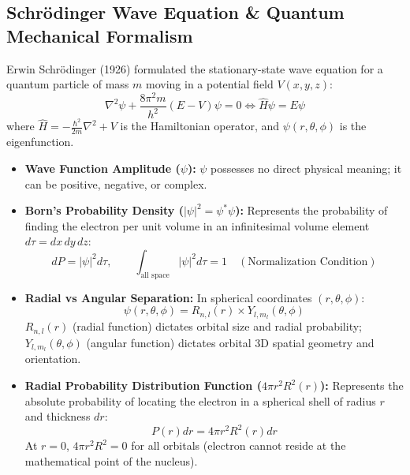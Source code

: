 \documentclass[10pt,twoside,openright]{book}
\begin{document}
\subsection{Schrödinger Wave Equation \& Quantum Mechanical Formalism}
Erwin Schrödinger (1926) formulated the stationary-state wave equation for a quantum particle of mass $m$ moving in a potential field $V(x,y,z)$:
\begin{equation}
  \nabla^2 \psi + \frac{8\pi^2 m}{h^2}(E - V)\psi = 0 \iff \hat{H}\psi = E\psi
\end{equation}
where $\hat{H} = -\frac{\hbar^2}{2m}\nabla^2 + V$ is the Hamiltonian operator, and $\psi(r, \theta, \phi)$ is the eigenfunction.

\begin{conceptbox}
\begin{itemize}
  \item \textbf{Wave Function Amplitude ($\psi$):} $\psi$ possesses no direct physical meaning; it can be positive, negative, or complex.
  \item \textbf{Born's Probability Density ($|\psi|^2 = \psi^* \psi$):} Represents the probability of finding the electron per unit volume in an infinitesimal volume element $d\tau = dx\,dy\,dz$:
  \begin{equation}
    dP = |\psi|^2 d\tau, \qquad \int_{\text{all space}} |\psi|^2 d\tau = 1 \quad (\text{Normalization Condition})
  \end{equation}
  \item \textbf{Radial vs Angular Separation:} In spherical coordinates $(r, \theta, \phi)$:
  \begin{equation}
    \psi(r, \theta, \phi) = R_{n,l}(r) \times Y_{l,m_l}(\theta, \phi)
  \end{equation}
  $R_{n,l}(r)$ (radial function) dictates orbital size and radial probability; $Y_{l,m_l}(\theta, \phi)$ (angular function) dictates orbital 3D spatial geometry and orientation.
  \item \textbf{Radial Probability Distribution Function ($4\pi r^2 R^2(r)$):} Represents the absolute probability of locating the electron in a spherical shell of radius $r$ and thickness $dr$:
  \begin{equation}
    P(r)dr = 4\pi r^2 R^2(r) dr
  \end{equation}
  At $r = 0$, $4\pi r^2 R^2 = 0$ for all orbitals (electron cannot reside at the mathematical point of the nucleus).
\end{itemize}
\end{conceptbox}
\end{document}
